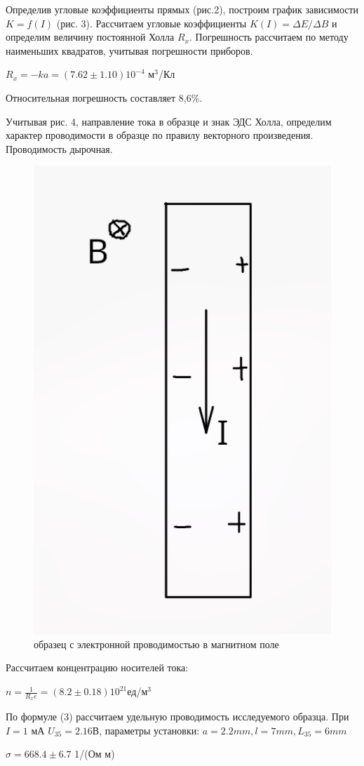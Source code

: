 \documentclass[a4paper]{article}
\begin{document}
\FloatBarrier

Определив угловые коэффициенты прямых (рис.2), построим график зависимости $K = f(I)$ (рис. 3). Рассчитаем угловые коэффициенты $K(I) = \Delta E / \Delta B$ и определим величину постоянной Холла $R_x$. Погрешность рассчитаем по методу наименьших квадратов, учитывая погрешности приборов.



\begin{center}
  $R_x = - k a = (7.62 \pm 1.10)10^{-4} $ м$^3$/Кл  
\end{center}

Относительная погрешность составляет 8,6\%.

Учитывая рис. 4, направление тока в образце и знак ЭДС Холла, определим характер проводимости в образце по правилу векторного произведения. Проводимость дырочная.

\begin{figure}
    \centering
    \includegraphics[width=0.5\linewidth]{image.png}
    \caption{образец с электронной проводимостью в магнитном поле}
    \label{fig:enter-label}
\end{figure}

\FloatBarrier
Рассчитаем концентрацию носителей тока:

\begin{center}
    $n = \frac{1}{R_x e} = (8.2 \pm 0.18)10^{21}$ед/м$^3$
\end{center}

По формуле (3) рассчитаем удельную проводимость исследуемого образца. При $I = 1$ мА $U_{35} = 2.16 $В, параметры установки: $a = 2.2mm, l = 7 mm, L_{35} = 6 mm$
 \begin{center}
     $\sigma = 668.4 \pm 6.7$ 1/(Ом м)
 \end{center}
 
\end{document}
